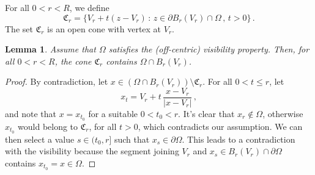 \documentclass[a4paper,reqno,11pt]{amsart}
\newtheorem{lemma}[theorem]{Lemma}
\newtheorem{remark}[theorem]{Remark}
\newcommand{\C}{{\mathfrak C}}
\newcommand{\de}{\partial}
\begin{document}
	For all $0 < r < R$, we define
	\begin{equation} \label{eq:Cr}
		\C_{r} = \{ V_r + t(z - V_r) \, : \, z \in \de B_{r}(V_r) \cap \Omega \, , \, t > 0 \} \, .
	\end{equation}
	The set $\C_{r}$ is an open cone with vertex at $V_r$.
	\begin{lemma} \label{lem:Crcontains}
		Assume that $\Omega$ satisfies the (off-centric) visibility property. Then, for all $0 < r < R$, the cone $\C_{r}$ contains $\Omega \cap B_{r}(V_r)$.
	\end{lemma}
	\begin{proof}
		By contradiction, let $x \in (\Omega \cap B_{r}(V_r)) \setminus \C_{r}$. For all $0 < t \leq r$, let
		\begin{equation*}
			x_{t} = V_r + t \, \dfrac{x - V_r}{|x - V_r|} \, ,
		\end{equation*}
		and note that $x = x_{t_{0}}$ for a suitable $0 < t_{0} < r$. It's clear that $x_{r} \notin \Omega$, otherwise $x_{t_{0}}$ would belong to $\C_{r}$, for all $t > 0$, which contradicts our assumption. We can then select a value $s \in (t_{0}, r]$ such that $x_{s} \in \de \Omega$. This leads to a contradiction with the visibility because the segment joining $V_r$ and $x_{s} \in B_{r}(V_r) \cap \de \Omega$ contains $x_{t_{0}} = x \in \Omega$.
	\end{proof}
	
\end{document}
